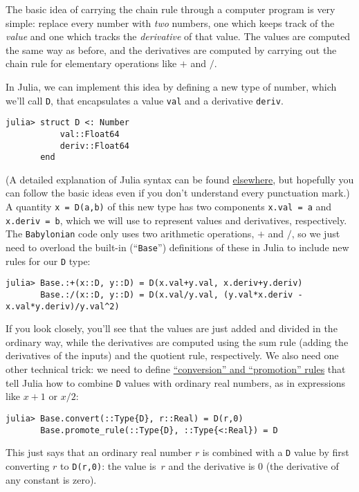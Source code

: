 The basic idea of carrying the chain rule through a computer program is very simple: replace every number with \emph{two} numbers, one which keeps track of the \emph{value} and one which tracks the \emph{derivative} of that value.  The values are computed the same way as before, and the derivatives are computed by carrying out the chain rule for elementary operations like $+$ and $/$.

In Julia, we can implement this idea by defining a new type of number, which we'll call \texttt{D}, that encapsulates a value \texttt{val} and a derivative \texttt{deriv}. 
\begin{verbatim}
julia> struct D <: Number
           val::Float64
           deriv::Float64
       end
\end{verbatim}
(A detailed explanation of Julia syntax can be found \href{https://julialang.org/learning/}{elsewhere}, but hopefully you can follow the basic ideas even if you don't understand every punctuation mark.)
A quantity \texttt{x = D(a,b)} of this new type has two components \texttt{x.val = a} and \texttt{x.deriv = b}, which we will use to represent values and derivatives, respectively.
The \texttt{Babylonian} code only uses two arithmetic operations, $+$ and $/$, so we just need to overload the built-in (``\texttt{Base}'') definitions of these in Julia to include new rules for our \texttt{D} type:
\begin{verbatim}
julia> Base.:+(x::D, y::D) = D(x.val+y.val, x.deriv+y.deriv)
       Base.:/(x::D, y::D) = D(x.val/y.val, (y.val*x.deriv - x.val*y.deriv)/y.val^2)
\end{verbatim}
If you look closely, you'll see that the values are just added and divided in the ordinary way, while the derivatives are computed using the sum rule (adding the derivatives of the inputs) and the quotient rule, respectively.   We also need one other technical trick: we need to define \href{https://docs.julialang.org/en/v1/manual/conversion-and-promotion/}{``conversion'' and ``promotion'' rules} that tell Julia how to combine \texttt{D} values with ordinary real numbers, as in expressions like $x+1$ or $x/2$:
\begin{verbatim}
julia> Base.convert(::Type{D}, r::Real) = D(r,0)
       Base.promote_rule(::Type{D}, ::Type{<:Real}) = D
\end{verbatim}
This just says that an ordinary real number $r$ is combined with a \texttt{D} value by first converting $r$ to \texttt{D(r,0)}: the value is~$r$ and the derivative is $0$ (the derivative of any constant is zero).

